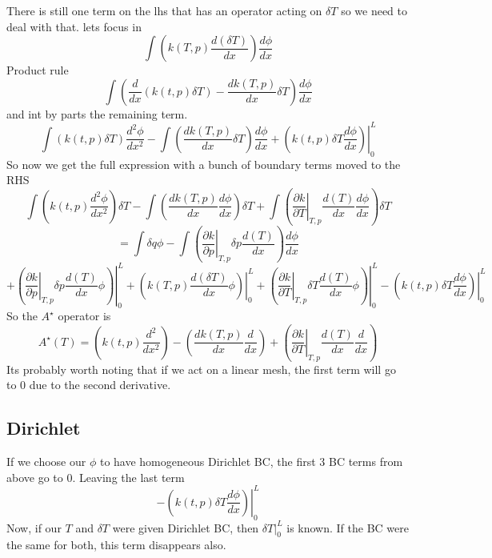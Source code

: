 \documentclass[11pt]{article}
\begin{document}
There is still one term on the lhs that has an operator acting on $\delta T$ so we need to deal with that. lets focus in
\[
\int \left( k(T,p) \frac{d(\delta T)}{dx} \right)\frac{d \phi}{dx}
\] 
Product rule
\[
\int \left( \frac{d}{dx} (k(t,p) \delta T)- \frac{d k(T,p)}{dx}\delta T \right)\frac{d \phi}{dx}
\]
and int by parts the remaining term.
\[
\int \left( k(t,p) \delta T\right)\frac{d^2 \phi}{dx^2}
- \int \left( \frac{d k(T,p)}{dx}\delta T \right)\frac{d \phi}{dx}
+ \left.\left( k(t,p) \delta T \frac{d \phi}{dx}  \right) \right|_0^L
\]
So now we get the full expression with a bunch of boundary terms moved to the RHS 
\[
\int \left( k(t,p) \frac{d^2 \phi}{dx^2} \right) \delta T 
- \int \left( \frac{d k(T,p)}{dx} \frac{d \phi}{dx} \right)\delta T 
+\int \left(\left.\frac{\partial k}{\partial T}\right|_{T,p} \frac{d(T)}{dx} \frac{d \phi}{dx} \right)\delta T
\]
\[
= \int \delta q \phi 
-\int \left(\left.\frac{\partial k}{\partial p}\right|_{T,p}\delta p \frac{d(T)}{dx} \right)\frac{d \phi}{dx}
\]
\[
+ \left. \left(\left.\frac{\partial k}{\partial p}\right|_{T,p}\delta p \frac{d(T)}{dx} \phi \right) \right|_0^L
+ \left. \left( k(T,p) \frac{d(\delta T)}{dx} \phi \right) \right|_0^L 
+ \left. \left(\left.\frac{\partial k}{\partial T}\right|_{T,p}\delta T \frac{d(T)}{dx} \phi \right ) \right|_0^L
- \left.\left( k(t,p) \delta T \frac{d \phi}{dx}  \right) \right|_0^L
\] 
So the $A^\star$ operator is
\[
A^\star (T) = \left( k(t,p) \frac{d^2}{dx^2} \right) 
- \left( \frac{d k(T,p)}{dx} \frac{d}{dx} \right) 
+ \left(\left.\frac{\partial k}{\partial T}\right|_{T,p} \frac{d(T)}{dx} \frac{d}{dx} \right)
\]
Its probably worth noting that if we act on a linear mesh, the first term will go to 0 due to the second derivative.
\subsection{Dirichlet}
If we choose our $\phi$ to have homogeneous Dirichlet BC, the first 3 BC terms from above go to 0. Leaving the last term 
\[
- \left.\left( k(t,p) \delta T \frac{d \phi}{dx}  \right) \right|_0^L
\]
Now, if our $T$ and $\delta T$ were given Dirichlet BC, then $\left. \delta T \right|_0^L$ is known. If the BC were the same for both, this term disappears also.
\end{document}
